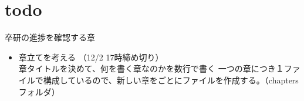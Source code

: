 \documentclass[main]{subfiles}
\begin{document}
\chapter{todo}
\label{cha:intro}
    卒研の進捗を確認する章
\begin{itemize}
    \item 章立てを考える （12/2 17時締め切り）\\
        章タイトルを決めて、何を書く章なのかを数行で書く
        一つの章につき１ファイルで構成しているので、新しい章をごとにファイルを作成する。（chaptersフォルダ）
\end{itemize}
\end{document}
